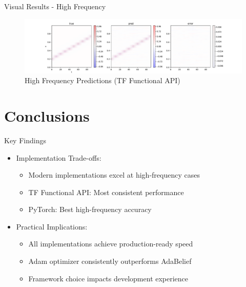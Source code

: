 \documentclass{beamer}
\begin{document}
\begin{frame}{Visual Results - High Frequency}
    \begin{figure}
        \includegraphics[width=\textwidth]{functional/high-frequency-adam-20250206-1520-1/vis}
        \caption{High Frequency Predictions (TF Functional API)}
    \end{figure}
\end{frame}

\section{Conclusions}
\begin{frame}{Key Findings}
    \begin{itemize}
        \item Implementation Trade-offs:
        \begin{itemize}
            \item Modern implementations excel at high-frequency cases
            \item TF Functional API: Most consistent performance
            \item PyTorch: Best high-frequency accuracy
        \end{itemize}
        \item Practical Implications:
        \begin{itemize}
            \item All implementations achieve production-ready speed
            \item Adam optimizer consistently outperforms AdaBelief
            \item Framework choice impacts development experience
        \end{itemize}
    \end{itemize}
\end{frame}
\end{document}
